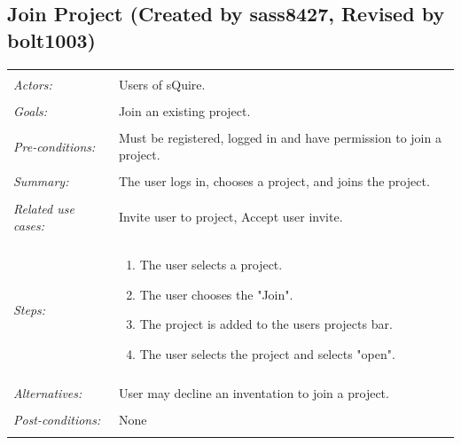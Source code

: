 \documentclass[11pt]{report}
\begin{document}
\subsection{Join Project (Created by sass8427, Revised by bolt1003)}
\begin{tabular}{ p{2cm} p{12cm} }
\hline
\\
\textit{Actors:} & Users of sQuire. \\ 
\\
\textit{Goals:} & Join an existing project.\\
\\
\textit{Pre-conditions:} & Must be registered, logged in and have permission to join a project.\\
\\
\textit{Summary:} & The user logs in, chooses a project, and joins the project. \\
\\
\textit{Related use cases:} & Invite user to project, Accept user invite. \\
\\
\textit{Steps:} & \begin{enumerate}
 \item The user selects a project.
 \item The user chooses the "Join". 
 \item The project is added to the users projects bar.
 \item The user selects the project and selects "open".
\end{enumerate}\\
\\
\textit{Alternatives:} & User may decline an inventation to join a project. \\
\\
\textit{Post-conditions:} & None \\
\\
\hline
\end{tabular}
\end{document}
